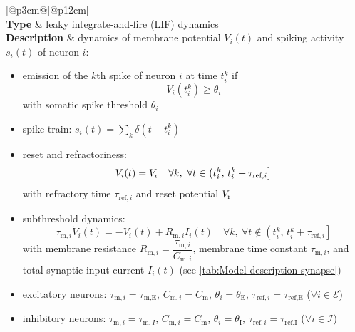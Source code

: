 \documentclass[10pt,a4paper,twoside,american]{article}
\newcommand{\Epop}{\mathcal{E}} %
\newcommand{\Ipop}{\mathcal{I}} %
\newcommand{\Vreset}{V_\textnormal{r}}
\begin{document}
\begin{table}[ht!]
\begin{tabular}{|@{\hspace*{1mm}}p{3cm}@{}|@{\hspace*{1mm}}p{12cm}|}
  \hline 
  \\
  \hline
  \textbf{Type} & leaky integrate-and-fire (LIF) dynamics \\
  \hline
    \textbf{Description} & dynamics of membrane potential $V_{i}(t)$  and spiking activity $s_i(t)$ of neuron $i$:                
            \begin{itemize}
              \item emission of the $k$th spike of neuron $i$ at time $t_{i}^{k}$ if
                \begin{equation}
                  V_{i}(t_{i}^{k})\geq\theta_i %
                \end{equation}
                 with somatic spike threshold $\theta_i$
              \item spike train: $s_i(t)=\sum_k\delta(t-t_i^k)$
              \item reset and refractoriness:
                \begin{equation*}
                  V_{i}(t)=\Vreset
                    \quad \forall{}k,\ \forall t \in \left(t_{i}^{k},\,t_{i}^{k}+\tau_{\text{ref},i}\right]
                \end{equation*}
                with refractory time $\tau_{\text{ref},i}$ and reset potential $\Vreset$
              \item subthreshold dynamics:
                \begin{equation}
                  \label{eq:lif}
                  \tau_{\text{m},i}\dot{V}_i(t)=-V_i(t)+R_{\text{m},i} I_i(t)
                    \quad \forall{}k,\ \forall t \notin \left(t_{i}^{k},\,t_{i}^{k}+\tau_{\text{ref},i}\right]
                \end{equation}
                with membrane resistance $R_{\text{m},i}=\dfrac{\tau_{\text{m},i}}{C_{\text{m},i}}$, membrane time constant $\tau_{\text{m},i}$, and total synaptic input current $I_i(t)$ (see \cref{tab:Model-description-synapse})
              \item excitatory neurons: $\tau_{\text{m},i}=\tau_\text{m,E}$, $C_{\text{m},i}=C_\text{m}$, $\theta_i=\theta_\text{E}$, $\tau_{\text{ref},i}=\tau_\text{ref,E}$ ($\forall i\in\Epop$)
              \item inhibitory neurons: $\tau_{\text{m},i}=\tau_{\text{m},I}$, $C_{\text{m},i}=C_\text{m}$, $\theta_i=\theta_\text{I}$, $\tau_{\text{ref},i}=\tau_\text{ref,I}$ ($\forall i\in\Ipop$)       
   
            \end{itemize}\\
              \hline 
\end{tabular}
\caption{Description of the neuron model. Parameter values are given in \cref{tab:Model-parameters}.}
\label{tab:Model-description-neuron}
\end{table}
\end{document}
